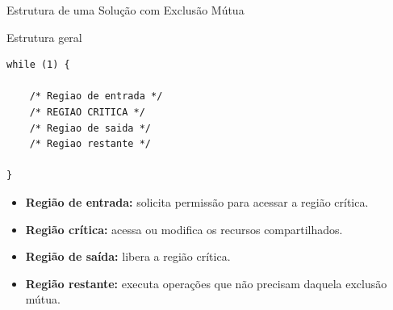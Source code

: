 \documentclass[aspectratio=169,11pt]{beamer}
\begin{document}
\begin{frame}[fragile]{Estrutura de uma Solução com Exclusão Mútua}

\begin{block}{Estrutura geral}

\begin{verbatim}
while (1) {

    /* Regiao de entrada */
    /* REGIAO CRITICA */
    /* Regiao de saida */
    /* Regiao restante */

}
\end{verbatim}

\end{block}

\vspace{0.3cm}

\begin{itemize}
    \item \textbf{Região de entrada:} solicita permissão para
    acessar a região crítica.

    \item \textbf{Região crítica:} acessa ou modifica
    os recursos compartilhados.

    \item \textbf{Região de saída:} libera a região crítica.

    \item \textbf{Região restante:} executa operações que
    não precisam daquela exclusão mútua.
\end{itemize}

\end{frame}


\end{document}
